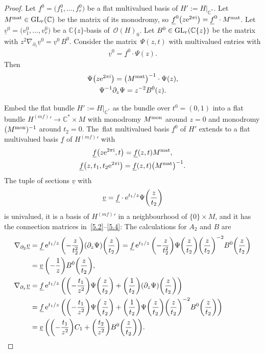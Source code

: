 \documentclass[10pt,a4paper]{amsart}
\numberwithin{equation}{section}
\numberwithin{figure}{section}
\newcommand{\C}{{\mathbb C}}
\newcommand{\OO}{{\mathcal O}}
\newcommand{\uuuu}{\underline}
\newcommand{\paa}{\partial}
\newcommand{\nnn}{\nabla}
\begin{document}
\begin{proof}
Let $\uuuu{f}^0=\big(f_1^0,\dots ,f_r^0\big)$ be a flat multivalued basis
of $H':=H|_{\C^*}$. Let $M^{\rm mat}\in {\rm GL}_r(\C)$
be the matrix of its monodromy, so
$\uuuu{f}^0\big(z {\rm e}^{2\pi {\rm i}}\big)=\uuuu{f}^0\cdot M^{\rm mat}$.
Let $\uuuu{v}^0=\big(v_1^0,\dots ,v_r^0\big)$ be a $\C\{z\}$-basis
of~$\OO(H)_0$. Let $B^0\in {\rm GL}_r(\C\{z\})$ be the matrix
with $z^2\nnn_{\paa_z}\uuuu{v}^0=\uuuu{v}^0\, B^0$.
Consider the mat\-rix~$\Psi(z,t)$ with multivalued entries with
\begin{gather*}%
\uuuu{v}^0=\uuuu{f}^0\cdot \Psi(z).
\end{gather*}
Then
\begin{gather*}%
\Psi\big(z{\rm e}^{2\pi {\rm i}}\big)= \big(M^{\rm mat}\big)^{-1}\cdot\Psi(z),
\\
\Psi^{-1}\paa_z \Psi = z^{-2}B^0(z).%
\end{gather*}

Embed the flat bundle $H':=H|_{\C^*}$ as the bundle
over $t^0=(0,1)$ into a flat bundle
${H^{(mf)}}'\to\C^*\times M$ with monodromy $M^{\rm mon}$
around $z=0$ and monodromy $(M^{\rm mon})^{-1}$ around
$t_2=0$. The~flat multivalued basis $\uuuu{f}^0$ of $H'$ extends
to a flat multivalued basis $\uuuu{f}$ of ${H^{(mf)}}'$ with
\begin{gather*}%
\uuuu{f}\big(z{\rm e}^{2\pi {\rm i}},t\big)=\uuuu{f}(z,t)M^{\rm mat},
\\
\uuuu{f}\big(z,t_1,t_2{\rm e}^{2\pi {\rm i}}\big)=\uuuu{f}(z,t)\big(M^{\rm mat}\big)^{-1}.
\label{5.9}
\end{gather*}
The tuple of sections $\uuuu{v}$ with
\begin{gather*}%
\uuuu{v}= \uuuu{f}\cdot {\rm e}^{t_1/z}\Psi\bigg(\frac{z}{t_2}\bigg)
\end{gather*}
is univalued, it is a basis of ${H^{(mf)}}'$ in a neighbourhood
of $\{0\}\times M$, and it has the connection matrices
in~\eqref{5.2}--\eqref{5.4}: The calculations for $A_2$
and $B$ are
\begin{align*}
\nnn_{\paa_2}\uuuu{v}&= \uuuu{f}\, {\rm e}^{t_1/z}\,
\bigg({-}\frac{z}{t_2^2}\bigg)(\paa_z\Psi)\bigg(\frac{z}{t_2}\bigg) = \uuuu{f}\, {\rm e}^{t_1/z}\, \bigg({-}\frac{z}{t_2^2}\bigg)
\Psi\bigg(\frac{z}{t_2}\bigg)\bigg(\frac{z}{t_2}\bigg)^{-2}B^0\bigg(\frac{z}{t_2}\bigg)\\
&=\uuuu{v}\, \bigg({-}\frac{1}{z}\bigg)B^0\bigg(\frac{z}{t_2}\bigg),
\\
\nnn_{\paa_z}\uuuu{v}
&= \uuuu{f}\, {\rm e}^{t_1/z}\,
\bigg(\bigg({-}\frac{t_1}{z^2}\bigg)\Psi\bigg(\frac{z}{t_2}\bigg)+ \bigg(\frac1{t_2}\bigg)(\paa_z\Psi)\bigg(\frac{z}{t_2}\bigg)\bigg)\\
&= \uuuu{f}\, {\rm e}^{t_1/z}\, \bigg(\bigg({-}\frac{t_1}{z^2}\bigg)\Psi\bigg(\frac{z}{t_2}\bigg)+ \bigg(\frac1{t_2}\bigg)
\Psi\bigg(\frac{z}{t_2}\bigg)\bigg(\frac{z}{t_2}\bigg)^{-2}B^0\bigg(\frac{z}{t_2}\bigg)\bigg)
\\
&=\uuuu{v}\, \bigg(\bigg({-}\frac{t_1}{z^2}\bigg)C_1+\bigg(\frac{t_2}{z^2}\bigg) B^0\bigg(\frac{z}{t_2}\bigg)\bigg).
\end{align*}


\end{proof}
\end{document}
